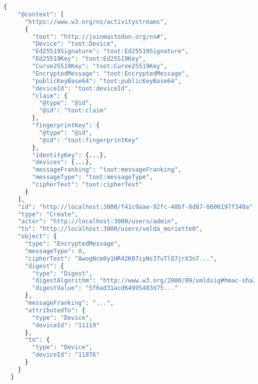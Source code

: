 \lstset{style=JSONStyle}
\begin{lstlisting}[language=PHP, caption=Example of encrypted message using Mastodon's E2EE API and extended JSON-LD vocabulary, label=appendix:e2e, float=ht]
  {
    "@context": [
      "https://www.w3.org/ns/activitystreams",
      {
        "toot": "http://joinmastodon.org/ns#",
        "Device": "toot:Device",
        "Ed25519Signature": "toot:Ed25519Signature",
        "Ed25519Key": "toot:Ed25519Key",
        "Curve25519Key": "toot:Curve25519Key",
        "EncryptedMessage": "toot:EncryptedMessage",
        "publicKeyBase64": "toot:publicKeyBase64",
        "deviceId": "toot:deviceId",
        "claim": {
          "@type": "@id",
          "@id": "toot:claim"
        },
        "fingerprintKey": {
          "@type": "@id",
          "@id": "toot:fingerprintKey"
        },
        "identityKey": {...},
        "devices": {...},
        "messageFranking": "toot:messageFranking",
        "messageType": "toot:messageType",
        "cipherText": "toot:cipherText"
      }
    ],
    "id": "http://localhost:3000/f41c9aae-92fc-48bf-8d87-0606197f340a",
    "type": "Create",
    "actor": "http://localhost:3000/users/admin",
    "to": "http://localhost:3000/users/velda_moriette0",
    "object": {
      "type": "EncryptedMessage",
      "messageType": 0,
      "cipherText": "AwogNcm0y1HR42K07iyNs37uTlQ7jrX3n7...",
      "digest": {
        "type": "Digest",
        "digestAlgorithm": "http://www.w3.org/2000/09/xmldsig#hmac-sha256",
        "digestValue": "5f6ad31acd64995483d75..."
      },
      "messageFranking": "...",
      "attributedTo": {
        "type": "Device",
        "deviceId": "11119"
      },
      "to": {
        "type": "Device",
        "deviceId": "11876"
      }
    }
  }
\end{lstlisting}

